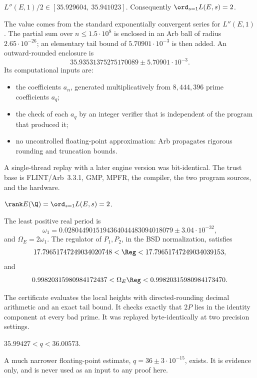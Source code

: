 \begin{theorem}\label{thm:lpp}
$L''(E,1)/2\in[35.929604,\ 35.941023]$. Consequently $\ord_{s=1}L(E,s)=2$.
\end{theorem}
The value comes from the standard exponentially convergent series for $L''(E,1)$ \cite[\S2.13]{cremona}. The partial sum over $n\le1.5\cdot10^8$ is enclosed in an Arb ball \cite{arb} of radius $2.65\cdot10^{-26}$; an elementary tail bound of $5.70901\cdot10^{-3}$ is then added. An outward-rounded enclosure is
\[
35.93531375275170089\pm5.70901\cdot10^{-3}.
\]
Its computational inputs are:
\begin{itemize}[leftmargin=*]
\item the coefficients $a_n$, generated multiplicatively from $8{,}444{,}396$ prime coefficients $a_q$;
\item the check of each $a_q$ by an integer verifier that is independent of the program that produced it;
\item no uncontrolled floating-point approximation: Arb propagates rigorous rounding and truncation bounds.
\end{itemize}
A single-thread replay with a later engine version was bit-identical. The trust base is FLINT/Arb~3.3.1, GMP, MPFR, the compiler, the two program sources, and the hardware.

\begin{theorem}\label{thm:rank}
$\rank E(\Q)=\ord_{s=1}L(E,s)=2$.
\end{theorem}

\begin{theorem}\label{thm:reg}
The least positive real period is
\[
\omega_1=0.0280449015194364044483094018079\pm3.04\cdot10^{-32},
\]
and $\Omega_E=2\omega_1$. The regulator of $P_1,P_2$, in the BSD normalization, satisfies
\[
17.79651747249034020748<\Reg<17.79651747249034039153,
\]
and
\[
0.99820315980984172437<\Omega_E\Reg<0.99820315980984173470 .
\]
\end{theorem}
The certificate evaluates the local heights with directed-rounding decimal arithmetic and an exact tail bound. It checks exactly that $2P$ lies in the identity component at every bad prime. It was replayed byte-identically at two precision settings.

\begin{theorem}\label{thm:qint}
$35.99427<q<36.00573$.
\end{theorem}
A much narrower floating-point estimate, $q=36\pm3\cdot10^{-15}$, exists. It is evidence only, and is never used as an input to any proof here.

